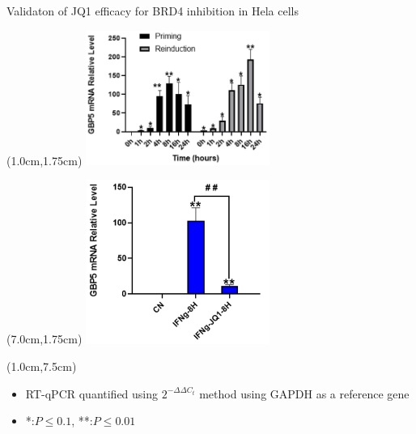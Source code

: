 \documentclass{beamer}					%
\begin{document}
\begin{frame}{Validaton of JQ1 efficacy for BRD4 inhibition in Hela cells}
\begin{textblock*}{6cm}(1.0cm,1.75cm)
\includegraphics[width=6cm]{GBP5-RT-qPCR-crop.png}
\end{textblock*}
\begin{textblock*}{6cm}(7.0cm,1.75cm)
\includegraphics[width=6cm]{GBP5-JQ1-KD-crop.png}
\end{textblock*}

\begin{textblock*}{13cm}(1.0cm,7.5cm)
\begin{itemize}
\item RT-qPCR quantified using $2^{-\Delta\Delta C_{t}}$ method using GAPDH as a reference gene
\item *:$P \leq 0.1$, **:$P \leq 0.01$
\end{itemize}
\end{textblock*}


\end{frame}
\end{document}
